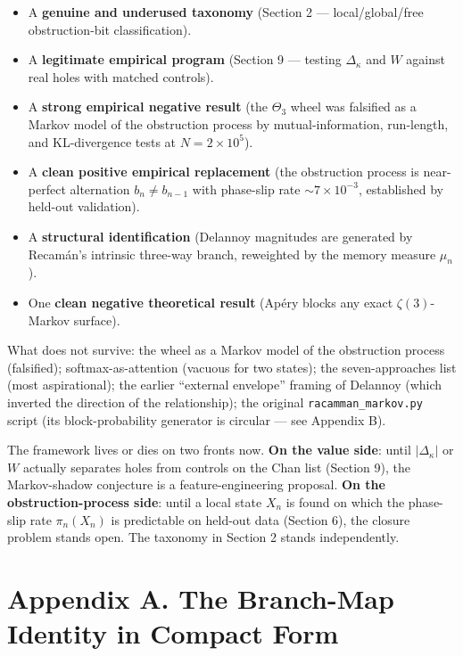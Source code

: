 \documentclass[
  11pt,
]{article}
\providecommand{\tightlist}{%
  \setlength{\itemsep}{0pt}\setlength{\parskip}{0pt}}
\begin{document}
\begin{itemize}
\tightlist
\item
  A \textbf{genuine and underused taxonomy} (Section 2 ---
  local/global/free obstruction-bit classification).
\item
  A \textbf{legitimate empirical program} (Section 9 --- testing
  \(\Delta_\kappa\) and \(W\) against real holes with matched controls).
\item
  A \textbf{strong empirical negative result} (the \(\Theta_3\) wheel
  was falsified as a Markov model of the obstruction process by
  mutual-information, run-length, and KL-divergence tests at
  \(N = 2 \times 10^5\)).
\item
  A \textbf{clean positive empirical replacement} (the obstruction
  process is near-perfect alternation \(b_n \ne b_{n-1}\) with
  phase-slip rate \(\sim 7 \times 10^{-3}\), established by held-out
  validation).
\item
  A \textbf{structural identification} (Delannoy magnitudes are
  generated by Recamán's intrinsic three-way branch, reweighted by the
  memory measure \(\mu_n\)).
\item
  One \textbf{clean negative theoretical result} (Apéry blocks any exact
  \(\zeta(3)\)-Markov surface).
\end{itemize}

What does not survive: the wheel as a Markov model of the obstruction
process (falsified); softmax-as-attention (vacuous for two states); the
seven-approaches list (most aspirational); the earlier ``external
envelope'' framing of Delannoy (which inverted the direction of the
relationship); the original \texttt{racamman\_markov.py} script (its
block-probability generator is circular --- see Appendix B).

The framework lives or dies on two fronts now. \textbf{On the value
side}: until \(|\Delta_\kappa|\) or \(W\) actually separates holes from
controls on the Chan list (Section 9), the Markov-shadow conjecture is a
feature-engineering proposal. \textbf{On the obstruction-process side}:
until a local state \(X_n\) is found on which the phase-slip rate
\(\pi_n(X_n)\) is predictable on held-out data (Section 6), the closure
problem stands open. The taxonomy in Section 2 stands independently.

\hypertarget{appendix-a.-the-branch-map-identity-in-compact-form}{%
\section{Appendix A. The Branch-Map Identity in Compact
Form}\label{appendix-a.-the-branch-map-identity-in-compact-form}}
\end{document}
